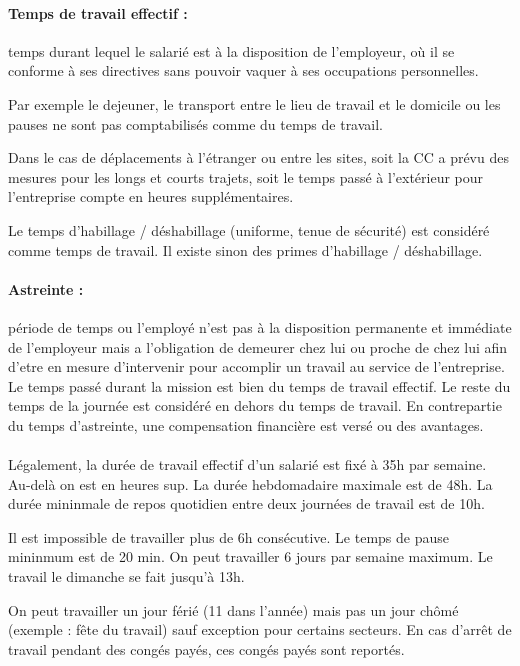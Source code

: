 \paragraph{Temps de travail effectif :} temps durant lequel le salarié est à la disposition de l’employeur, où il se conforme à ses directives sans pouvoir vaquer à ses occupations personnelles.

Par exemple le dejeuner, le transport entre le lieu de travail et le domicile ou les pauses ne sont pas comptabilisés comme du temps de travail.

Dans le cas de déplacements à l'étranger ou entre les sites, soit la CC a prévu des mesures pour les longs et courts trajets, soit le temps passé à l’extérieur pour l'entreprise compte en heures supplémentaires.

Le temps d'habillage / déshabillage (uniforme, tenue de sécurité) est considéré comme temps de travail.
Il existe sinon des primes d'habillage / déshabillage.

\paragraph{Astreinte :} période de temps ou l’employé n’est pas à la disposition permanente et immédiate de l’employeur mais a l’obligation de demeurer chez lui ou proche de chez lui afin d’etre en mesure d’intervenir pour accomplir un travail au service de l’entreprise.
Le temps passé durant la mission est bien du temps de travail effectif.
Le reste du temps de la journée est considéré en dehors du temps de travail.
En contrepartie du temps d’astreinte, une compensation financière est versé ou des avantages.

\paragraph{}
Légalement, la durée de travail effectif d’un salarié est fixé à 35h par semaine.
Au-delà on est en heures sup.
La durée hebdomadaire maximale est de 48h.
La durée mininmale de repos quotidien entre deux journées de travail est de 10h.

Il est impossible de travailler plus de 6h consécutive.
Le temps de pause mininmum est de 20 min.
On peut travailler 6 jours par semaine maximum.
Le travail le dimanche se fait jusqu’à 13h.

On peut travailler un jour férié (11 dans l'année) mais pas un jour chômé (exemple : fête du travail) sauf exception pour certains secteurs.
En cas d'arrêt de travail pendant des congés payés, ces congés payés sont reportés.

